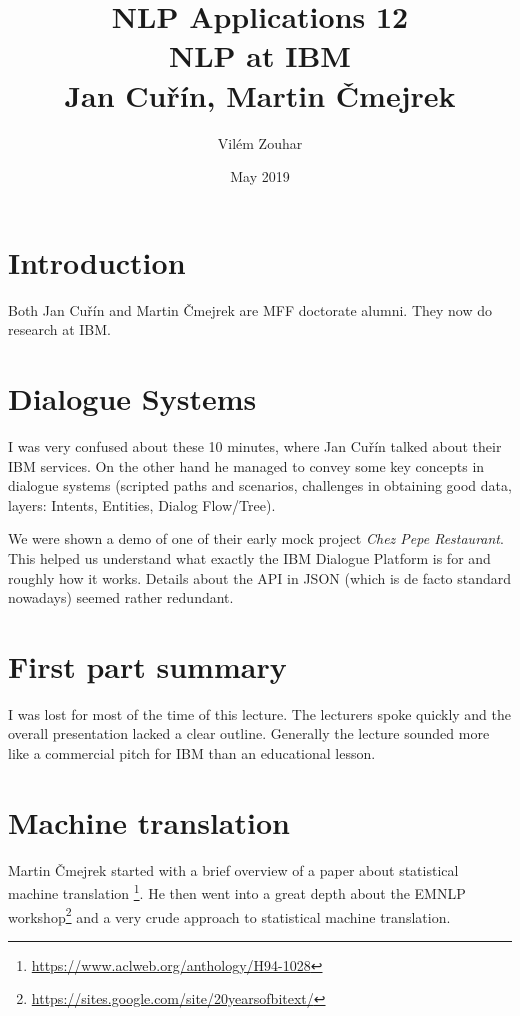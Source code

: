 \documentclass[a4paper]{article}
\begin{document}
\title{NLP Applications 12\\NLP at IBM\\Jan Cuřín, Martin Čmejrek}
\author{Vilém Zouhar}
\date{May 2019}
\maketitle 
\hspace{-4cm}


\section*{Introduction}
Both Jan Cuřín and Martin Čmejrek are MFF doctorate alumni. They now do research at IBM.

\section*{Dialogue Systems}

I was very confused about these 10 minutes, where Jan Cuřín talked about their IBM services. On the other hand he managed to convey some key concepts in dialogue systems (scripted paths and scenarios, challenges in obtaining good data, layers: Intents, Entities, Dialog Flow/Tree).

We were shown a demo of one of their early mock project \textit{Chez Pepe Restaurant}. This helped us understand what exactly the IBM Dialogue Platform is for and roughly how it works. Details about the API in JSON (which is de facto standard nowadays) seemed rather redundant.

\section*{First part summary}

I was lost for most of the time of this lecture. The lecturers spoke quickly and the overall presentation lacked a clear outline. Generally the lecture sounded more like a commercial pitch for IBM than an educational lesson.

\section*{Machine translation}
Martin Čmejrek started with a brief overview of a paper about statistical machine translation \footnote{\href{https://www.aclweb.org/anthology/H94-1028}{https://www.aclweb.org/anthology/H94-1028}}. He then went into a great depth about the EMNLP workshop\footnote{\href{https://sites.google.com/site/20yearsofbitext/}{https://sites.google.com/site/20yearsofbitext/}} and a very crude approach to statistical machine translation.
\end{document}
